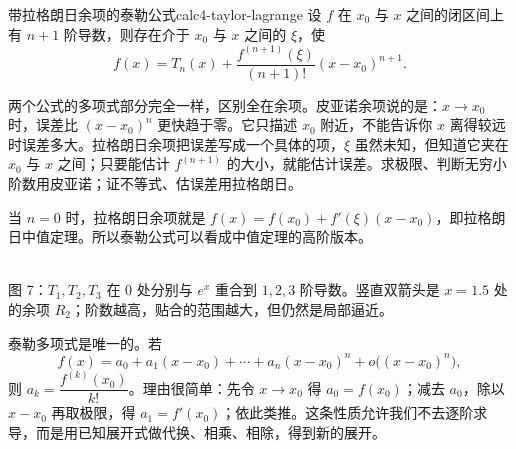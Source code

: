 \begin{conclusion}{带拉格朗日余项的泰勒公式}{calc4-taylor-lagrange}
设 $f$ 在 $x_0$ 与 $x$ 之间的闭区间上有 $n+1$ 阶导数，则存在介于 $x_0$ 与 $x$ 之间的 $\xi$，使
\[
f(x)=T_n(x)+\frac{f^{(n+1)}(\xi)}{(n+1)!}(x-x_0)^{n+1}.
\]
\end{conclusion}

两个公式的多项式部分完全一样，区别全在余项。皮亚诺余项说的是：$x\to x_0$ 时，误差比 $(x-x_0)^n$ 更快趋于零。它只描述 $x_0$ 附近，不能告诉你 $x$ 离得较远时误差多大。拉格朗日余项把误差写成一个具体的项，$\xi$ 虽然未知，但知道它夹在 $x_0$ 与 $x$ 之间；只要能估计 $f^{(n+1)}$ 的大小，就能估计误差。求极限、判断无穷小阶数用皮亚诺；证不等式、估误差用拉格朗日。

当 $n=0$ 时，拉格朗日余项就是 $f(x)=f(x_0)+f'(\xi)(x-x_0)$，即拉格朗日中值定理。所以泰勒公式可以看成中值定理的高阶版本。

\begin{center}
\\[2pt]
{\footnotesize 图 7：$T_1,T_2,T_3$ 在 $0$ 处分别与 $e^x$ 重合到 $1,2,3$ 阶导数。竖直双箭头是 $x=1.5$ 处的余项 $R_2$；阶数越高，贴合的范围越大，但仍然是局部逼近。}
\end{center}

泰勒多项式是唯一的。若
\[
f(x)=a_0+a_1(x-x_0)+\cdots+a_n(x-x_0)^n+o\bigl((x-x_0)^n\bigr),
\]
则 $a_k=\dfrac{f^{(k)}(x_0)}{k!}$。理由很简单：先令 $x\to x_0$ 得 $a_0=f(x_0)$；减去 $a_0$，除以 $x-x_0$ 再取极限，得 $a_1=f'(x_0)$；依此类推。这条性质允许我们不去逐阶求导，而是用已知展开式做代换、相乘、相除，得到新的展开。

